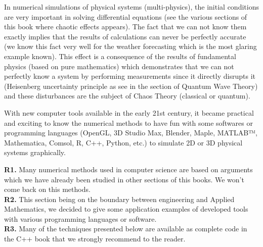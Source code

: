 	\begin{figure}[H]
		\centering
	\end{figure}

In numerical simulations of physical systems (multi-physics), the initial conditions are very important in solving differential equations (see the various sections of this book where chaotic effects appears). The fact that we can not know them exactly implies that the results of calculations can never be perfectly accurate (we know this fact very well for the weather forecasting which is the most glaring example known). This effect is a consequence of the results of fundamental physics (based on pure mathematics) which demonstrates that we can not perfectly know a system by performing measurements since it directly disrupts it (Heisenberg uncertainty principle as see in the section of Quantum Wave Theory) and these disturbances are the subject of Chaos Theory (classical or quantum).

With new computer tools available in the early 21st century, it became practical and exciting to know the numerical methods to have fun with some softwares or programming languages (OpenGL, 3D Studio Max, Blender, Maple, MATLAB™, Mathematica, Comsol, R, C++, Python, etc.) to simulate 2D or 3D physical systems graphically.

	\begin{tcolorbox}[title=Remarks,colframe=black,arc=10pt]
	\textbf{R1.} Many numerical methods used in computer science are based on arguments which we have already been studied in other sections of this books. We won't come back on this methods.\\
	
	\textbf{R2.} This section being on the boundary between engineering and Applied Mathematics, we decided to give some application examples of developed tools with various programming languages or software.\\
	
	\textbf{R3.} Many of the techniques presented below are available as complete code in the C++ book \cite{oliveira2015practical} that we strongly recommend to the reader.
	\end{tcolorbox}	
	
